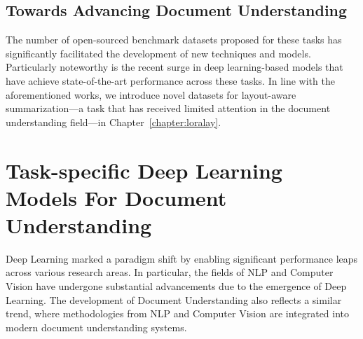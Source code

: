 
\subsection{Towards Advancing Document Understanding}

The number of open-sourced benchmark datasets proposed for these tasks has significantly facilitated the development of new techniques and models. Particularly noteworthy is the recent surge in deep learning-based models that have achieve state-of-the-art performance across these tasks. In line with the aforementioned works, we introduce novel datasets for layout-aware summarization—a task that has received limited attention in the document understanding field—in Chapter~\ref{chapter:loralay}. 



\section{Task-specific Deep Learning Models For Document Understanding}

Deep Learning marked a paradigm shift by enabling significant performance leaps across various research areas. In particular, the fields of \ac{NLP} and Computer Vision have undergone substantial advancements due to the emergence of Deep Learning. The development of Document Understanding also reflects a similar trend, where methodologies from \ac{NLP} and Computer Vision are integrated into modern document understanding systems. 

